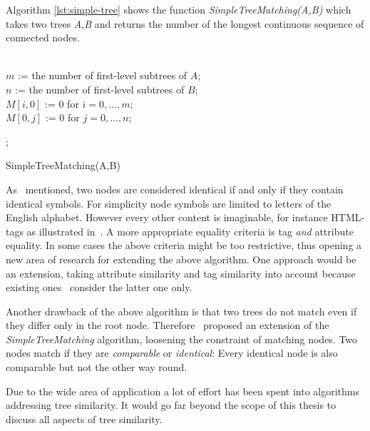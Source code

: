 \documentclass[12pt, notitlepage]{article}
\begin{document}
Algorithm \ref{lst:simple-tree} shows the function \textit{SimpleTreeMatching(A,B)} which takes two trees \textit{A},\textit{B} and returns the number of the longest continuous sequence of connected nodes.\\ 
\\
\begin{algorithm}[H]
\SetAlgoLined
	$m$ := the number of first-level subtrees of $A$;\\
	$n$ := the number of first-level subtrees of $B$;\\
	$M[i,0]$ := 0 for $i=0,\ldots,m$;\\
	$M[0,j]$ := 0 for $j=0,\ldots,n$;\\
	
	
	;
\caption{SimpleTreeMatching(A,B)\label{lst:simple-tree}}
\end{algorithm}
\vspace{\baselineskip}
As~\cite{yang} mentioned, two nodes are considered identical if and only if they contain identical symbols. For simplicity
node symbols are limited to letters of the English alphabet. However every other content is imaginable, for instance HTML-tags
as illustrated in~\cite{simple-tree-matching}. A more appropriate equality criteria is tag \textit{and} attribute equality. 
In some cases the above criteria might be too restrictive, thus opening a new area of research for extending the above algorithm.
One approach would be an extension, taking attribute similarity and tag similarity into account because existing
ones~\cite{simple-tree-matching} consider the latter one only.

Another drawback of the above algorithm is that two trees do not match even if they differ only in the root node. 
Therefore~\citet{yang} proposed an extension of the \textit{SimpleTreeMatching} algorithm, loosening the constraint of matching
nodes. Two nodes match if they are \textit{comparable} or \textit{identical}: Every identical node is also comparable but not the other way round. 

Due to the wide area of application a lot of effort has been spent into algorithms addressing tree similarity.
It would go far beyond the scope of this thesis to discuss all aspects of tree similarity. 
\end{document}
